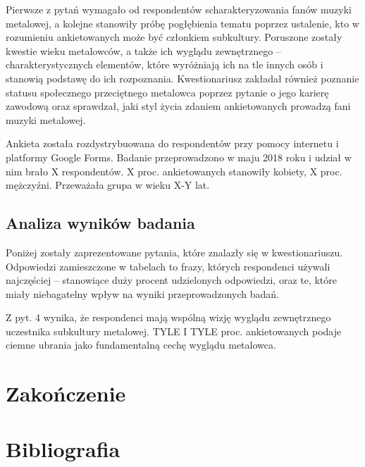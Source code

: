 \documentclass[12pt, a4paper, titlepage]{report}
\begin{document}
Pierwsze z pytań wymagało od respondentów scharakteryzowania fanów muzyki metalowej, a kolejne stanowiły próbę pogłębienia tematu poprzez ustalenie, kto w rozumieniu ankietowanych może być członkiem subkultury. Poruszone zostały kwestie wieku metalowców, a także ich wyglądu zewnętrznego -- charakterystycznych elementów, które wyróżniają ich na tle innych osób i stanowią podstawę do ich rozpoznania. Kwestionariusz zakładał również poznanie statusu społecznego przeciętnego metalowca poprzez pytanie o jego karierę zawodową oraz sprawdzał, jaki styl życia zdaniem ankietowanych prowadzą fani muzyki metalowej.

Ankieta została rozdystrybuowana do respondentów przy pomocy internetu i platformy Google Forms. Badanie przeprowadzono w maju 2018 roku i udział w nim brało X respondentów. X proc. ankietowanych stanowiły kobiety, X proc. mężczyźni. Przeważała grupa w wieku X-Y lat. 

\section{Analiza wyników badania}
Poniżej zostały zaprezentowane pytania, które znalazły się w kwestionariuszu. Odpowiedzi zamieszczone w tabelach to frazy, których respondenci używali najczęściej -- stanowiące duży procent udzielonych odpowiedzi, oraz te, które miały niebagatelny wpływ na wyniki przeprowadzonych badań. 

Z pyt. 4 wynika, że respondenci mają wspólną wizję wyglądu zewnętrznego uczestnika subkultury metalowej. TYLE I TYLE proc. ankietowanych podaje ciemne ubrania jako fundamentalną cechę wyglądu metalowca. 
\chapter*{Zakończenie}
\chapter*{Bibliografia}
\end{document}
